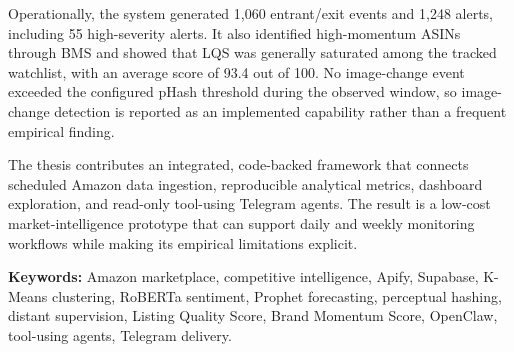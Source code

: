 Operationally, the system generated 1,060 entrant/exit events and 1,248 alerts, including 55 high-severity alerts. It also identified high-momentum ASINs through BMS and showed that LQS was generally saturated among the tracked watchlist, with an average score of 93.4 out of 100. No image-change event exceeded the configured pHash threshold during the observed window, so image-change detection is reported as an implemented capability rather than a frequent empirical finding.

The thesis contributes an integrated, code-backed framework that connects scheduled Amazon data ingestion, reproducible analytical metrics, dashboard exploration, and read-only tool-using Telegram agents. The result is a low-cost market-intelligence prototype that can support daily and weekly monitoring workflows while making its empirical limitations explicit.

\vspace{0.5cm}
\noindent\textbf{Keywords:} Amazon marketplace, competitive intelligence, Apify, Supabase, K-Means clustering, RoBERTa sentiment, Prophet forecasting, perceptual hashing, distant supervision, Listing Quality Score, Brand Momentum Score, OpenClaw, tool-using agents, Telegram delivery.
